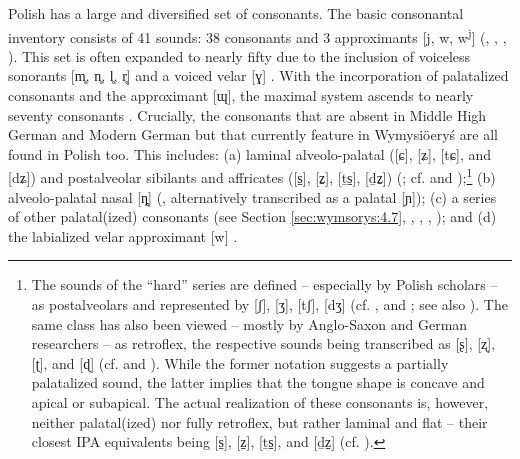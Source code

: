 \documentclass[output=paper,hidelinks]{langscibook}
\begin{document}
Polish has a large and diversified set of consonants. The basic consonantal inventory consists of 41 sounds: 38 consonants and 3 approximants [j, w, w\textsuperscript{j}] (\citealt{bak_gramatyka_1997}, \citealt[74]{strutynski_gramatyka_1998}, \citealt{jassem_polish_2003}, \citealt[3--8]{gussmann_phonology_2007}). This set is often expanded to nearly fifty due to the inclusion of voiceless sonorants [m̥, n̥, l̥, r̥] and a voiced velar [ɣ] \citep[4]{gussmann_phonology_2007}. With the incorporation of palatalized consonants and the approximant [ɰ], the maximal system ascends to nearly seventy consonants \citep[54, 72--73]{strutynski_gramatyka_1998}. Crucially, the consonants that are absent in Middle High German and Modern German but that currently feature in Wymysiöeryś are all found in Polish too. This includes: (a) laminal alveolo-palatal ([ɕ], [ʑ], [tɕ], and [dʑ]) and postalveolar sibilants and affricates ([s̠], [z̠], [ṯs̠], [ḏz̠]) (\citealt{hamann_phonetics_2003, hamann_retroflex_2004}; cf. \citealt{karas_slownik_1977} and \citealt[75--78]{gussmann_phonology_2007});\footnote{The sounds of the ``hard'' series are defined – especially by Polish scholars – as postalveolars and represented by [ʃ], [ʒ], [tʃ], [dʒ] (cf. \citealt{biedrzycki_abris_1974, spencer_non-linear_1986, dogil_hissing_1990, jassem_polish_2003}, and \citealt{gussmann_phonology_2007}; see also \citealt{stieber_rozwoj_nodate, rospond_gramatyka_1971, wierzchowska_fonetyka_1980}). The same class has also been viewed – mostly by Anglo-Saxon and German researchers – as retroflex, the respective sounds being transcribed as [ʂ], [ʐ], [ʈ], and [ɖ] (cf. \citealt{keating_coronal_1991, ladefoged_sounds_1996, padgett_evolution_2003, hamann_phonetics_2003} and \citeyear{hamann_retroflex_2004}). While the former notation suggests a partially palatalized sound, the latter implies that the tongue shape is concave and apical or subapical. The actual realization of these consonants is, however, neither palatal(ized) nor fully retroflex, but rather laminal and flat – their closest IPA equivalents being [s̠], [z̠], [ṯs̠], and [ḏz̠] (cf. \citealt{hamann_phonetics_2003}).} (b) alveolo-palatal nasal [ȵ] (\citealt[104]{jassem_polish_2003}, alternatively transcribed as a palatal [ɲ]); (c) a series of other palatal(ized) consonants (see Section \ref{sec:wymsorys:4.7}, \citealt[687--690]{rothstein_polish_1993}, \citealt[38, 42--44, 54]{strutynski_gramatyka_1998}, \citealt[165--166]{sussex_slavic_2006}, \citealt[4--7]{gussmann_phonology_2007}); and (d) the labialized velar approximant [w] \citep{jassem_polish_2003, strutynski_gramatyka_1998, gussmann_phonology_2007}.
\end{document}
